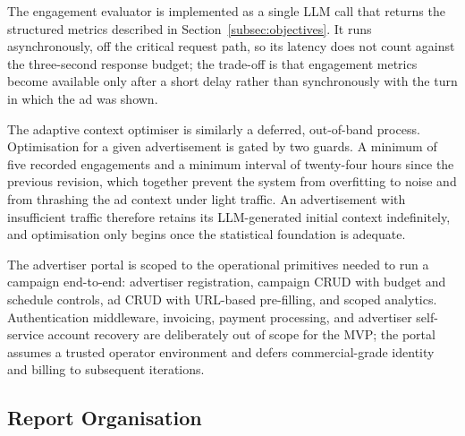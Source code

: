The engagement evaluator is implemented as a single LLM call that returns the
structured metrics described in Section~\ref{subsec:objectives}. It runs
asynchronously, off the critical request path, so its latency does not count
against the three-second response budget; the trade-off is that engagement
metrics become available only after a short delay rather than synchronously
with the turn in which the ad was shown.

The adaptive context optimiser is similarly a deferred, out-of-band process.
Optimisation for a given advertisement is gated by two guards. A minimum of
five recorded engagements and a minimum interval of twenty-four hours since
the previous revision, which together prevent the system from overfitting to
noise and from thrashing the ad context under light traffic. An advertisement
with insufficient traffic therefore retains its LLM-generated initial context
indefinitely, and optimisation only begins once the statistical foundation is
adequate.

The advertiser portal is scoped to the operational primitives needed to run a
campaign end-to-end: advertiser registration, campaign CRUD with budget and
schedule controls, ad CRUD with URL-based pre-filling, and scoped analytics.
Authentication middleware, invoicing, payment processing, and advertiser
self-service account recovery are deliberately out of scope for the MVP; the
portal assumes a trusted operator environment and defers commercial-grade
identity and billing to subsequent iterations.

\subsection{Report Organisation}
\label{subsec:report-org}

